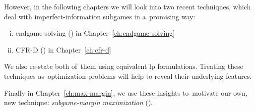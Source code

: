 However, in the following chapters we will look into two recent techniques, which deal with imperfect-information subgames in a~promising way:
\begin{enumerate}[(i)]
  \item endgame solving (\cite{Ganzfried2015endgame}) in Chapter~\ref{ch:endgame-solving}
  \item CFR-D (\cite{BurchJohansonBowling13}) in Chapter~\ref{ch:cfr-d}
\end{enumerate}
We also re-state both of~them using equivalent \acrshort{lp} formulations.
Treating these techniques as~optimization problems will help to reveal their underlying features.

Finally in Chapter~\ref{ch:max-margin}, we use these insights to~motivate our own, new technique: \emph{subgame-margin maximization} (\cite{Moravcik2016refining}).
